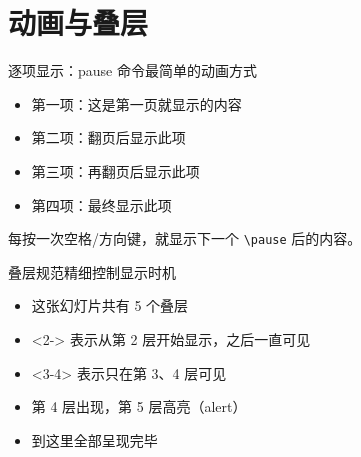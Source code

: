 \documentclass[UTF8,11pt,aspectratio=169]{beamer}
\begin{document}
\section{动画与叠层}

\begin{frame}{逐项显示：pause 命令}{最简单的动画方式}
    \begin{itemize}
        \item 第一项：这是第一页就显示的内容
        \pause
        \item 第二项：翻页后显示此项
        \pause
        \item 第三项：再翻页后显示此项
        \pause
        \item 第四项：最终显示此项
    \end{itemize}

    \pause
    \alert{每按一次空格/方向键，就显示下一个 \texttt{\textbackslash pause} 后的内容。}
\end{frame}

\begin{frame}{叠层规范}{精细控制显示时机}
    \begin{itemize}
        \item<1-> 这张幻灯片共有 5 个叠层
        \item<2-> <2-> 表示从第 2 层开始显示，之后一直可见
        \item<3-4> <3-4> 表示只在第 3、4 层可见
        \item<4-|alert@5> 第 4 层出现，第 5 层高亮（alert）
        \item<5-> 到这里全部呈现完毕
    \end{itemize}


\end{frame}
\end{document}

